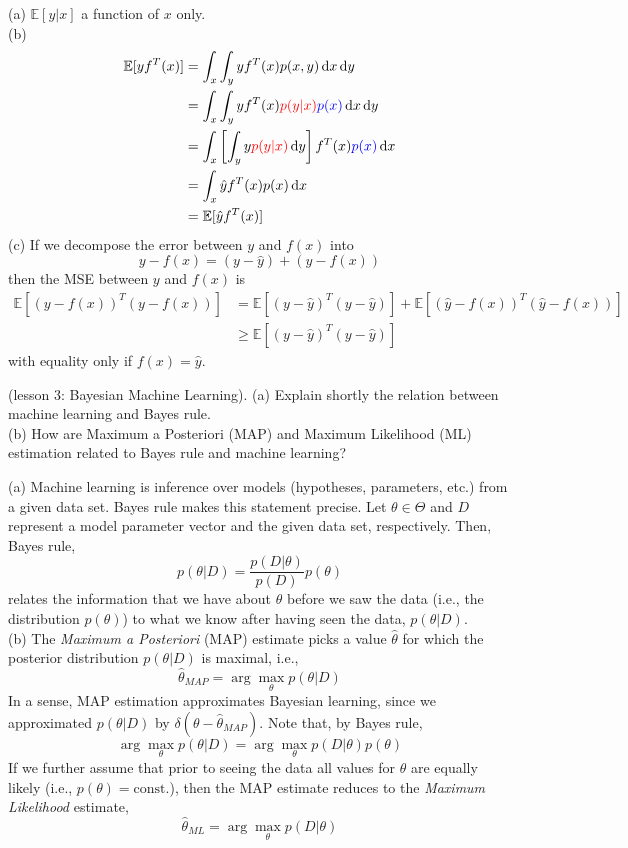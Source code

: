\documentclass[a4paper]{article}
\newcommand{\Exp}{\mathbb{E}}
\def\r#1{{\color{red}#1}}
\def\b#1{{\color{blue}#1}}
\def\d#1{{\,\mathrm{d}#1}}
\begin{document}
\begin{ExerciseList}
\Answer[ref={ex:conditional-mean}]
(a) $\Exp[y|x]$ a function of $x$ only.\\
(b)
\begin{align*}
\Exp[yf^T(x)] &= \int_x \int_y yf^T(x) p(x,y)\d{x}\d{y}\\
&= \int_x \int_y yf^T(x) \r{p(y|x)}\b{p(x)} \d{x}\d{y}\\
&= \int_x \left[\int_y y \r{p(y|x)}\d{y}\right] f^T(x) \b{p(x)} \d{x}\\
&= \int_x \hat y f^T(x) p(x) \d{x}\\
&= \Exp[\hat y f^T(x)]
\end{align*}
(c) If we decompose the error between $y$ and $f(x)$ into
$$
y - f(x) = (y-\hat y)+(\hat y - f(x))
$$
then the MSE between $y$ and $f(x)$ is
\begin{align*}
\Exp[(y-f(x))^T(y-f(x))] &= \Exp[(y-\hat y)^T(y-\hat y)] + \Exp[(\hat y - f(x))^T(\hat y-f(x))] \\
    &\geq \Exp[(y-\hat y)^T(y-\hat y)]
\end{align*}
with equality only if $f(x) = \hat y$.

\Exercise[label={ex:ml-map}] (lesson 3: Bayesian Machine Learning).  (a) Explain shortly the relation between machine learning and Bayes rule.\\
(b) How are Maximum a Posteriori (MAP) and Maximum Likelihood (ML) estimation related to Bayes rule and machine learning?

\Answer[ref={ex:ml-map}] (a) Machine learning is inference over models (hypotheses, parameters, etc.) from a given data set. Bayes rule makes this statement precise. Let $\theta \in \Theta$ and $D$ represent a model parameter vector and the given data set, respectively. Then, Bayes rule,
$$
p(\theta|D) = \frac{p(D|\theta)}{p(D)} p(\theta)
$$
relates the information that we have about $\theta$ before we saw the data (i.e., the distribution $p(\theta)$) to what we know after having seen the data, $p(\theta|D)$. \\
(b) The \emph{Maximum a Posteriori} (MAP) estimate picks a value $\hat\theta$ for which the posterior distribution $p(\theta|D)$ is maximal, i.e.,
$$ \hat\theta_{MAP} = \arg\max_\theta p(\theta|D)$$
In a sense, MAP estimation approximates Bayesian learning, since we approximated $p(\theta|D)$ by $\delta(\theta-\hat\theta_{MAP})$. Note that, by Bayes rule, $$\arg\max_\theta p(\theta|D) = \arg\max_\theta p(D|\theta)p(\theta)$$
If we further assume that prior to seeing the data all values for $\theta$ are equally likely (i.e., $p(\theta)=\text{const.}$), then the MAP estimate reduces to the \emph{Maximum Likelihood} estimate,
$$ \hat\theta_{ML} = \arg\max_\theta p(D|\theta)$$





\end{ExerciseList}
\end{document}
